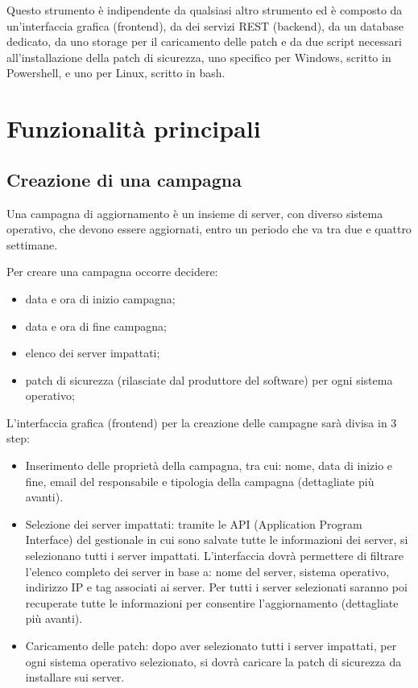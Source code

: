 Questo strumento è indipendente da qualsiasi altro strumento ed è composto
da un’interfaccia grafica (frontend), da dei servizi REST (backend), da
un database dedicato, da uno storage per il caricamento delle patch e da
due script necessari all’installazione della patch di sicurezza, uno 
specifico per Windows, scritto in Powershell, e uno per Linux, scritto 
in bash.


\section{Funzionalità principali}
\subsection{Creazione di una campagna}
Una campagna di aggiornamento è un insieme di server, con diverso sistema 
operativo, che devono essere aggiornati, entro un periodo che va tra due e 
quattro settimane. 

\noindent Per creare una campagna occorre decidere:
\begin{itemize}
\item data e ora di inizio campagna;
\item data e ora di fine campagna;
\item elenco dei server impattati;
\item patch di sicurezza (rilasciate dal produttore del software) per 
ogni sistema operativo;
\end{itemize}
L’interfaccia grafica (frontend) per la creazione delle campagne sarà 
divisa in 3 step:
\begin{itemize}
\item Inserimento delle proprietà della campagna, tra cui: nome, data di 
inizio e fine, email del responsabile e tipologia della campagna 
(dettagliate più avanti).
\item Selezione dei server impattati: tramite le API (Application Program 
Interface) del gestionale in cui sono salvate tutte le informazioni dei 
server, si selezionano tutti i server impattati. L’interfaccia dovrà 
permettere di filtrare l’elenco completo dei server in base a: nome del
server, sistema operativo, indirizzo IP e tag associati ai server. 
Per tutti i server selezionati saranno poi recuperate tutte le informazioni
per consentire l’aggiornamento (dettagliate più avanti).
\item Caricamento delle patch: dopo aver selezionato tutti i server impattati,
per ogni sistema operativo selezionato, si dovrà caricare la patch di sicurezza 
da installare sui server.
\end{itemize}

